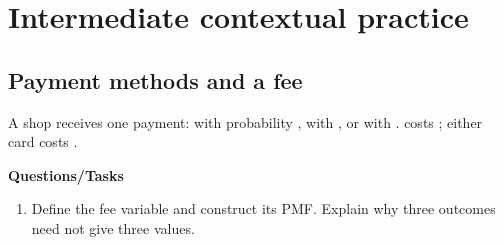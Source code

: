 \section{Intermediate contextual practice}\label{sec:t2-c1-intermediate}


\subsection{Payment methods and a fee}
\label{subsec:t2-c1-payment-methods-and-a-fee}
A shop receives one payment:  with probability ,  with , or  with .  costs ; either card costs .

\textbf{Questions/Tasks}
\begin{enumerate}
\item Define the fee variable and construct its PMF. Explain why three outcomes need not give three values.
\end{enumerate}

